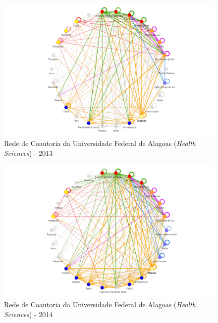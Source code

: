 \begin{figure}[H]
	\centering
	\includegraphics[scale=0.6]{Imagens/rede-al-2013.pdf}
	\caption{Rede de Coautoria da Universidade Federal de Alagoas (\textit{Health Sciences}) - 2013}
	\label{Rede de Coautoria - UF AL 2013}
\end{figure}

\begin{figure}[H]
	\centering
	\includegraphics[scale=0.6]{Imagens/rede-al-2014.pdf}
	\caption{Rede de Coautoria da Universidade Federal de Alagoas (\textit{Health Sciences}) - 2014}
	\label{Rede de Coautoria - UF AL 2014}
\end{figure}


